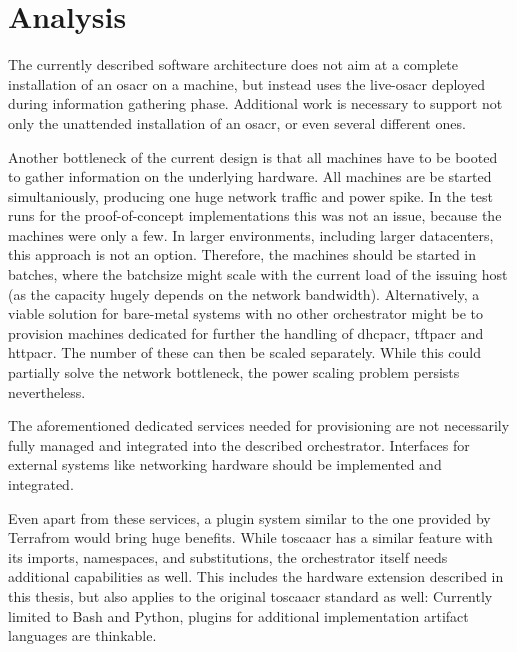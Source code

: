 \chapter{Analysis}



The currently described software architecture does not aim at a complete installation of an \gls{osacr} on a machine, but instead uses the live-\gls{osacr} deployed during information gathering phase. Additional work is necessary to support not only the unattended installation of an \gls{osacr}, or even several different ones.

Another bottleneck of the current design is that all machines have to be booted to gather information on the underlying hardware. All machines are be started simultaniously, producing one huge network traffic and power spike. In the test runs for the proof-of-concept implementations this was not an issue, because the machines were only a few. In larger environments, including larger datacenters, this approach is not an option. Therefore, the machines should be started in batches, where the batchsize might scale with the current load of the issuing host (as the capacity hugely depends on the network bandwidth). Alternatively, a viable solution for bare-metal systems with no other orchestrator might be to provision machines dedicated for further the handling of \gls{dhcpacr}, \gls{tftpacr} and \gls{httpacr}. The number of these can then be scaled separately. While this could partially solve the network bottleneck, the power scaling problem persists nevertheless.

The aforementioned dedicated services needed for provisioning are not necessarily fully managed and integrated into the described orchestrator. Interfaces for external systems like networking hardware should be implemented and integrated.

Even apart from these services, a plugin system similar to the one provided by Terrafrom would bring huge benefits. While \gls{toscaacr} has a similar feature with its imports, namespaces, and substitutions, the orchestrator itself needs additional capabilities as well. This includes the hardware extension described in this thesis, but also applies to the original \gls{toscaacr} standard as well: Currently limited to Bash and Python, plugins for additional implementation artifact languages are thinkable.

